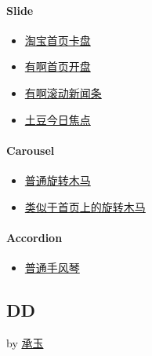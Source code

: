 \documentclass[letterpaper,10pt,english]{sphinxmanual}
\begin{document}
\paragraph{Slide}
\label{demo/component/switchable/index:slide}\begin{itemize}
\item {}
\href{http://yiminghe.github.com/kissy/src/switchable/demo/slide.html\#demo2}{淘宝首页卡盘}

\item {}
\href{http://yiminghe.github.com/kissy/src/switchable/demo/slide.html\#demo3}{有啊首页开盘}

\item {}
\href{http://yiminghe.github.com/kissy/src/switchable/demo/slide.html\#demo5}{有啊滚动新闻条}

\item {}
\href{http://yiminghe.github.com/kissy/src/switchable/demo/slide.html\#slideFocus}{土豆今日焦点}

\end{itemize}


\paragraph{Carousel}
\label{demo/component/switchable/index:carousel}\begin{itemize}
\item {}
\href{http://yiminghe.github.com/kissy/src/switchable/demo/carousel.html\#demo4}{普通旋转木马}

\item {}
\href{http://yiminghe.github.com/kissy/src/switchable/demo/carousel.html\#J\_TinySlide}{类似于首页上的旋转木马}

\end{itemize}


\paragraph{Accordion}
\label{demo/component/switchable/index:accordion}\begin{itemize}
\item {}
\href{http://yiminghe.github.com/kissy/src/switchable/demo/accordion.html}{普通手风琴}

\end{itemize}


\subsection{DD}
\label{demo/component/dd/index:dd}\label{demo/component/dd/index::doc}
by \href{mailto:yiminghe@gmail.com}{承玉}
\end{document}
